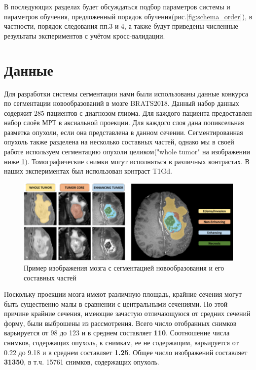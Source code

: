 В последующих разделах будет обсуждаться подбор параметров системы и параметров обучения, предложенный порядок обучения(рис.\ref{fig:schema_order}), в частности, порядок следования пп.3 и 4, а также будут приведены численные результаты экспериментов с учётом кросс-валидации.

\section{Данные}

Для разработки системы сегментации нами были использованы данные конкурса по сегментации новообразований в мозге BRATS2018. Данный набор данных содержит 285 пациентов с диагнозом глиома. Для каждого пациента предоставлен набор слоёв МРТ в аксиальной проекции. Для каждого слоя дана попиксельная разметка опухоли, если она представлена в данном сечении. Сегментированная опухоль также разделена на несколько составных частей, однако мы в своей работе используем сегментацию опухоли целиком("whole tumor" на изображении ниже \ref{fig:bratss}).  Томографические снимки могут исполняться в различных контрастах. В наших экспериментах был использован контраст T1Gd. 

\begin{figure}[ht] 
  \center
  \includegraphics [scale=0.6] {images/brats.png}
  \caption{ Пример изображения мозга с сегментацией новообразования и его составных частей} 
  \label{fig:bratss}  
\end{figure}
Поскольку проекции мозга имеют различную площадь, крайние сечения могут быть существенно малы в сравнении с центральными сечениями. По этой причине крайние сечения, имеющие зачастую отличающуюся от средних сечений форму, были выброшены из рассмотрения. Всего число отобранных снимков варьируется от 98 до 123 и в среднем составляет {\bf 110}. Соотношение числа снимков, содержащих опухоль, к снимкам, ее не содержащим, варьируется от 0.22 до 9.18 и в среднем составляет {\bf 1.25}. Общее число изображений составляет {\bf 31350}, в т.ч. 15761 снимков, содержащих опухоль. 

